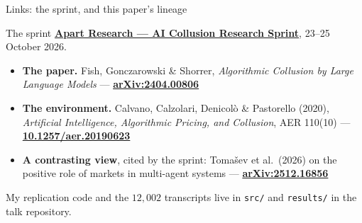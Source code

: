 \documentclass[aspectratio=169,9pt]{beamer}
\newcommand{\orange}[1]{\textcolor{AmazonOrange}{\textbf{#1}}}
\newcommand{\blue}[1]{\textcolor{densityblue}{\textbf{#1}}}
\newcommand{\muted}[1]{\textcolor{EPICMuted}{#1}}
\begin{document}
\begin{frame}{Links: the sprint, and this paper's lineage}
\begin{block}{The sprint}
\href{https://apartresearch.com/sprints/ai-collusion-research-sprint-2026-10-23-to-2026-10-25}{\orange{Apart
Research --- AI Collusion Research Sprint}}, 23--25 October 2026.
\end{block}
\vspace{0.15cm}
\begin{itemize}
    \item \textbf{The paper.} Fish, Gonczarowski \& Shorrer, \textit{Algorithmic Collusion by Large Language
    Models} --- \href{https://arxiv.org/abs/2404.00806}{\blue{arXiv:2404.00806}}
    \item \textbf{The environment.} Calvano, Calzolari, Denicol\`o \& Pastorello (2020), \textit{Artificial
    Intelligence, Algorithmic Pricing, and Collusion}, AER 110(10) ---
    \href{https://doi.org/10.1257/aer.20190623}{\blue{10.1257/aer.20190623}}
    \item \textbf{A contrasting view}, cited by the sprint: Toma\v{s}ev et al.\ (2026) on the positive role of
    markets in multi-agent systems --- \href{https://arxiv.org/abs/2512.16856}{\blue{arXiv:2512.16856}}
\end{itemize}
\vspace{0.2cm}
\muted{My replication code and the $12{,}002$ transcripts live in \texttt{src/} and \texttt{results/} in the
talk repository.}
\end{frame}
\end{document}
